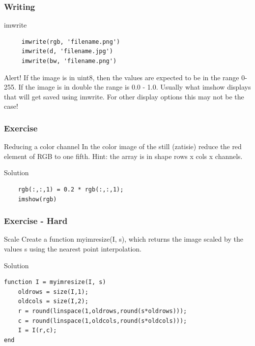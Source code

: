 \documentclass{beamer}
\begin{document}
\begin{frame}[fragile]
\frametitle{Writing} 
  \begin{block}{imwrite}
  \begin{verbatim}
     imwrite(rgb, 'filename.png')
     imwrite(d, 'filename.jpg')
     imwrite(bw, 'filename.png')   \end{verbatim}  
  \end{block}
  
  \begin{alertblock}{Alert!}
  If the image is in uint8, then the values are expected to be in the range 0-255. If the image is in double the range is 0.0 - 1.0. Usually what imshow displays that will get saved using imwrite. For other display options this may not be the case!
  \end{alertblock}
\end{frame}

\begin{frame}[fragile]
\frametitle{Exercise} 
  \begin{block}{Reducing a color channel}
  In the color image of the still (zatisie) reduce the red element of RGB to one fifth. Hint: the array is in shape rows x cols x channels.
  \end{block}
  
  \pause
  
  \begin{block}{Solution}
  \begin{verbatim}
    rgb(:,:,1) = 0.2 * rgb(:,:,1); 
    imshow(rgb)   \end{verbatim}  
  \end{block}
\end{frame}

\begin{frame}[fragile]
\frametitle{Exercise - Hard} 
  \begin{block}{Scale}
  Create a function myimresize(I, s), which returns the image scaled by the values s using the nearest point interpolation.
  \end{block}
  
  \pause
  
  \begin{block}{Solution}
  \begin{verbatim}
function I = myimresize(I, s)
    oldrows = size(I,1);
    oldcols = size(I,2);
    r = round(linspace(1,oldrows,round(s*oldrows)));
    c = round(linspace(1,oldcols,round(s*oldcols)));
    I = I(r,c);        
end  \end{verbatim}  
  \end{block}
\end{frame}
\end{document}
